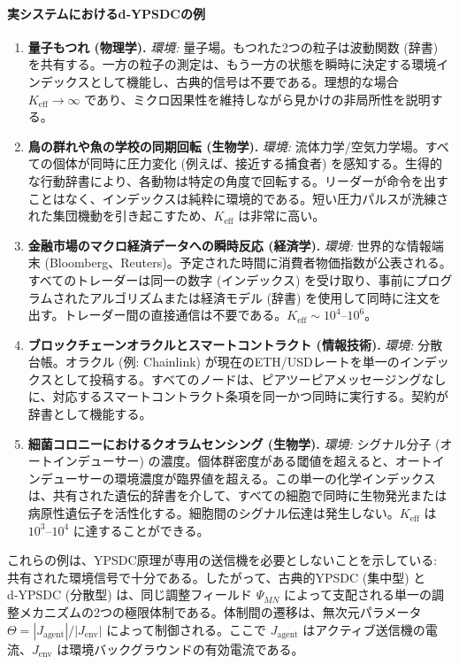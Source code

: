 \documentclass[11pt,a4paper]{article}
\begin{document}
	\paragraph*{実システムにおけるd‑YPSDCの例}
	\begin{enumerate}[leftmargin=*]
		\item \textbf{量子もつれ (物理学).}
		\textit{環境:} 量子場。もつれた2つの粒子は波動関数 (辞書) を共有する。一方の粒子の測定は、もう一方の状態を瞬時に決定する環境インデックスとして機能し、古典的信号は不要である。理想的な場合 $K_{\mathrm{eff}}\to\infty$ であり、ミクロ因果性を維持しながら見かけの非局所性を説明する。
		
		\item \textbf{鳥の群れや魚の学校の同期回転 (生物学).}
		\textit{環境:} 流体力学/空気力学場。すべての個体が同時に圧力変化 (例えば、接近する捕食者) を感知する。生得的な行動辞書により、各動物は特定の角度で回転する。リーダーが命令を出すことはなく、インデックスは純粋に環境的である。短い圧力パルスが洗練された集団機動を引き起こすため、$K_{\mathrm{eff}}$ は非常に高い。
		
		\item \textbf{金融市場のマクロ経済データへの瞬時反応 (経済学).}
		\textit{環境:} 世界的な情報端末 (Bloomberg、Reuters)。予定された時間に消費者物価指数が公表される。すべてのトレーダーは同一の数字 (インデックス) を受け取り、事前にプログラムされたアルゴリズムまたは経済モデル (辞書) を使用して同時に注文を出す。トレーダー間の直接通信は不要である。$K_{\mathrm{eff}}\sim 10^{4}$--$10^{6}$。
		
		\item \textbf{ブロックチェーンオラクルとスマートコントラクト (情報技術).}
		\textit{環境:} 分散台帳。オラクル (例: Chainlink) が現在のETH/USDレートを単一のインデックスとして投稿する。すべてのノードは、ピアツーピアメッセージングなしに、対応するスマートコントラクト条項を同一かつ同時に実行する。契約が辞書として機能する。
		
		\item \textbf{細菌コロニーにおけるクオラムセンシング (生物学).}
		\textit{環境:} シグナル分子 (オートインデューサー) の濃度。個体群密度がある閾値を超えると、オートインデューサーの環境濃度が臨界値を超える。この単一の化学インデックスは、共有された遺伝的辞書を介して、すべての細胞で同時に生物発光または病原性遺伝子を活性化する。細胞間のシグナル伝達は発生しない。$K_{\mathrm{eff}}$ は $10^{3}$--$10^{4}$ に達することができる。
	\end{enumerate}
	
	これらの例は、YPSDC原理が専用の送信機を必要としないことを示している: 共有された環境信号で十分である。したがって、古典的YPSDC (集中型) とd‑YPSDC (分散型) は、同じ調整フィールド $\Psi_{MN}$ によって支配される単一の調整メカニズムの2つの極限体制である。体制間の遷移は、無次元パラメータ $\Theta = |J_{\mathrm{agent}}|/|J_{\mathrm{env}}|$ によって制御される。ここで $J_{\mathrm{agent}}$ はアクティブ送信機の電流、$J_{\mathrm{env}}$ は環境バックグラウンドの有効電流である。
	
\end{document}
